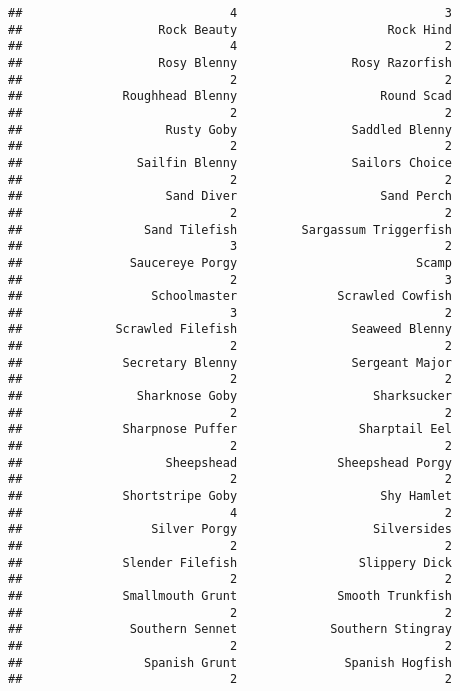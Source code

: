 \documentclass[
]{article}
\begin{document}
\begin{verbatim}
##                             4                             3 
##                   Rock Beauty                     Rock Hind 
##                             4                             2 
##                   Rosy Blenny                Rosy Razorfish 
##                             2                             2 
##              Roughhead Blenny                    Round Scad 
##                             2                             2 
##                    Rusty Goby                Saddled Blenny 
##                             2                             2 
##                Sailfin Blenny                Sailors Choice 
##                             2                             2 
##                    Sand Diver                    Sand Perch 
##                             2                             2 
##                 Sand Tilefish         Sargassum Triggerfish 
##                             3                             2 
##               Saucereye Porgy                         Scamp 
##                             2                             3 
##                  Schoolmaster              Scrawled Cowfish 
##                             3                             2 
##             Scrawled Filefish                Seaweed Blenny 
##                             2                             2 
##              Secretary Blenny                Sergeant Major 
##                             2                             2 
##                Sharknose Goby                   Sharksucker 
##                             2                             2 
##              Sharpnose Puffer                 Sharptail Eel 
##                             2                             2 
##                    Sheepshead              Sheepshead Porgy 
##                             2                             2 
##              Shortstripe Goby                    Shy Hamlet 
##                             4                             2 
##                  Silver Porgy                   Silversides 
##                             2                             2 
##              Slender Filefish                 Slippery Dick 
##                             2                             2 
##              Smallmouth Grunt              Smooth Trunkfish 
##                             2                             2 
##               Southern Sennet             Southern Stingray 
##                             2                             2 
##                 Spanish Grunt               Spanish Hogfish 
##                             2                             2 

\end{verbatim}
\end{document}
